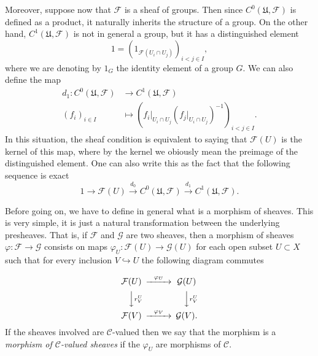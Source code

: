 \documentclass[12pt,a4paper]{article}
\begin{document}
    Moreover, suppose now that $\mathcal{F}$ is a sheaf of groups. Then since $C^0(\mathfrak{U},\mathcal{F})$ is defined as a product, it naturally inherits the structure of a group. On the other hand, $C^1(\mathfrak{U},\mathcal{F})$ is not in general a group, but it has a distinguished element
    \begin{equation*}
      1=(1_{\mathcal{F}(U_i\cap U_j)})_{i<j \in I},
    \end{equation*}
where we are denoting by $1_G$ the identity element of a group $G$. We can also define the map
  \begin{align*}
    d_1: C^0(\mathfrak{U},\mathcal{F})&\longrightarrow C^1(\mathfrak{U},\mathcal{F})\\ 
    (f_{i})_{i \in I} &\longmapsto (f_{i}|_{U_i \cap U_j}(f_{j}|_{U_i \cap U_j})^{-1})_{i<j \in I}.
    \end{align*}
    In this situation, the sheaf condition is equivalent to saying that $\mathcal{F}(U)$ is the kernel of this map, where by the kernel we obiously mean the preimage of the distinguished element. One can also write this as the fact that the following sequence is exact
    \begin{equation*}
      1\rightarrow \mathcal{F}(U) \overset{d_0}{\rightarrow} C^0(\mathfrak{U},\mathcal{F}) \overset{d_1}{\rightarrow} C^1(\mathfrak{U},\mathcal{F}).
    \end{equation*}

    Before going on, we have to define in general what is a morphism of sheaves. This is very simple, it is just a natural transformation between the underlying presheaves. That is, if $\mathcal{F}$ and $\mathcal{G}$ are two sheaves, then a morphism of sheaves $\varphi:\mathcal{F} \rightarrow \mathcal{G}$ consists on maps $\varphi_U: \mathcal{F}(U) \rightarrow \mathcal{G}(U)$ for each open subset $U\subset X$ such that for every inclusion $V\hookrightarrow U$ the following diagram commutes

    \begin{equation*}
    \begin{CD}
      \mathcal{F}(U) @> \varphi_U >> \mathcal{G}(U) \\
      @VV r^U_{V} V   @VV r^U_{V} V \\
      \mathcal{F}(V) @> \varphi_V >> \mathcal{G}(V).
    \end{CD}
    \end{equation*}
    If the sheaves involved are $\mathcal{C}$-valued then we say that the morphism is a \emph{morphism of  $\mathcal{C}$-valued sheaves} if the $\varphi_U$ are morphisms of $\mathcal{C}$.
\end{document}

